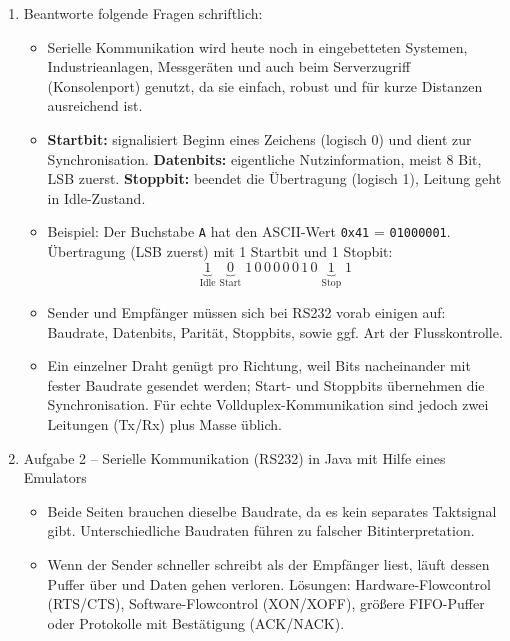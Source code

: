 \documentclass[11pt,a4paper,oneside]{article}
\newcounter{boxseq}
\newcommand{\nextboxcolors}{%
	\stepcounter{boxseq}%
	\ifcase\value{boxseq}%
	\def\CurrentAccentName{Step0}%
	\or\def\CurrentAccentName{Step1}%
	\or\def\CurrentAccentName{Step2}%
	\or\def\CurrentAccentName{Step3}%
	\or\def\CurrentAccentName{Step4}%
	\or\def\CurrentAccentName{Step5}%
	\or\def\CurrentAccentName{Step6}%
	\else\def\CurrentAccentName{Step7}%
	\fi
	\edef\CurrentAccentDarkName{\CurrentAccentName!70!black}%
	\edef\CurrentAccentFrameName{\CurrentAccentName!50!black}%
}
\newcounter{loesung}[section]
\renewcommand{\theloesung}{\thesection.\arabic{loesung}}
\newenvironment{loesung}[1]{%
	\refstepcounter{loesung}%
	\nextboxcolors%
	\begin{tcolorbox}[termbase,
		colframe=\CurrentAccentFrameName,
		boxed title style={interior style={left color=\CurrentAccentName, right color=\CurrentAccentDarkName}},
		title={Lösung~\theloesung: #1}]%
	}{\end{tcolorbox}}
\begin{document}
	\begin{loesung}{Serielle Kommunikation}
		\begin{enumerate}
			\item Beantworte folgende Fragen schriftlich:
			\begin{itemize}
				\item Serielle Kommunikation wird heute noch in eingebetteten Systemen, Industrieanlagen, Messgeräten und auch beim Serverzugriff (Konsolenport) genutzt, da sie einfach, robust und für kurze Distanzen ausreichend ist.
				
				\item \textbf{Startbit:} signalisiert Beginn eines Zeichens (logisch 0) und dient zur Synchronisation.  
				\textbf{Datenbits:} eigentliche Nutzinformation, meist 8 Bit, LSB zuerst.  
				\textbf{Stoppbit:} beendet die Übertragung (logisch 1), Leitung geht in Idle-Zustand.
				
				\item Beispiel: Der Buchstabe \texttt{A} hat den ASCII-Wert \texttt{0x41} = \texttt{01000001}.  
				Übertragung (LSB zuerst) mit 1 Startbit und 1 Stopbit:  
				\[
				\underbrace{1}_{\text{Idle}} \; 
				\underbrace{0}_{\text{Start}} \;
				1\,0\,0\,0\,0\,0\,1\,0 \;
				\underbrace{1}_{\text{Stop}} \;
				1
				\]
				
				\item Sender und Empfänger müssen sich bei RS232 vorab einigen auf: Baudrate, Datenbits, Parität, Stoppbits, sowie ggf. Art der Flusskontrolle.
				
				\item Ein einzelner Draht genügt pro Richtung, weil Bits nacheinander mit fester Baudrate gesendet werden; Start- und Stoppbits übernehmen die Synchronisation. Für echte Vollduplex-Kommunikation sind jedoch zwei Leitungen (Tx/Rx) plus Masse üblich.
			\end{itemize}
			
			\item Aufgabe 2 – Serielle Kommunikation (RS232) in Java mit Hilfe eines Emulators
			\begin{itemize}
				\item Beide Seiten brauchen dieselbe Baudrate, da es kein separates Taktsignal gibt. Unterschiedliche Baudraten führen zu falscher Bitinterpretation.
				
				\item Wenn der Sender schneller schreibt als der Empfänger liest, läuft dessen Puffer über und Daten gehen verloren.  
				Lösungen: Hardware-Flowcontrol (RTS/CTS), Software-Flowcontrol (XON/XOFF), größere FIFO-Puffer oder Protokolle mit Bestätigung (ACK/NACK).
			\end{itemize}
		\end{enumerate}
	\end{loesung}
	
\end{document}
